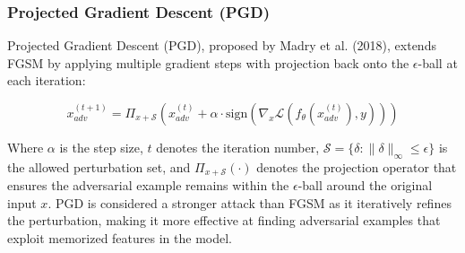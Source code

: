 \subsubsection{Projected Gradient Descent (PGD)}

Projected Gradient Descent (PGD), proposed by Madry 
et al. (2018), extends FGSM by applying multiple 
gradient steps with projection back onto the 
$\epsilon$-ball at each iteration:

\begin{equation}
x_{adv}^{(t+1)} = \Pi_{x+\mathcal{S}} \left( 
x_{adv}^{(t)} + \alpha \cdot \text{sign}\left(
\nabla_x \mathcal{L}(f_\theta(x_{adv}^{(t)}), y)
\right)\right)
\label{eq:pgd}
\end{equation}

Where $\alpha$ is the step size, $t$ denotes the 
iteration number, $\mathcal{S} = \{\delta : 
\|\delta\|_\infty \leq \epsilon\}$ is the allowed 
perturbation set, and $\Pi_{x+\mathcal{S}}(\cdot)$ 
denotes the projection operator that ensures the 
adversarial example remains within the 
$\epsilon$-ball around the original input $x$. 
PGD is considered a stronger attack than FGSM as 
it iteratively refines the perturbation, making 
it more effective at finding adversarial examples 
that exploit memorized features in the model.